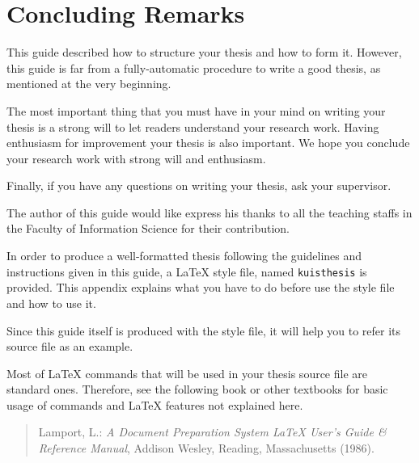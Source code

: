 \documentclass[english]{kuisthesis}
\def\|{\verb|}
\begin{document}
\section{Concluding Remarks}\label{sec-conclusion}
This guide described how to structure your thesis and how to form it.
However, this guide is far from a fully-automatic procedure to write a good
thesis, as mentioned at the very beginning.

The most important thing that you must have in your mind on writing your
thesis is a strong will to let readers understand your research work.
Having enthusiasm for improvement your thesis is also important.  We hope
you conclude your research work with strong will and enthusiasm.

Finally, if you have any questions on writing your thesis, ask your
supervisor.

\acknowledgments				% Acknowledgments
The author of this guide would like express his thanks to all the teaching
staffs in the Faculty of Information Science for their
contribution.

\nocite{*}
			% BibTeX style
				% Output references

						% Here an appendix starts
In order to produce a well-formatted thesis following the guidelines and
instructions given in this guide, a \LaTeX{} style file, named \|kuisthesis|
is provided.  This appendix explains what you have to do before use the style
file and how to use it.

Since this guide itself is produced with the style file, it will help you to
refer its source file as an example.

Most of \LaTeX{} commands that will be used in your thesis source file are
standard ones.  Therefore, see the following book or other textbooks for
basic usage of commands and \LaTeX{} features not explained here.
\begin{quote}%
Lamport, L.: {\em A Document Preparation System {\LaTeX} User's Guide \&
Reference Manual\/}, Addison Wesley, Reading, Massachusetts (1986).
\end{quote}%
\end{document}
